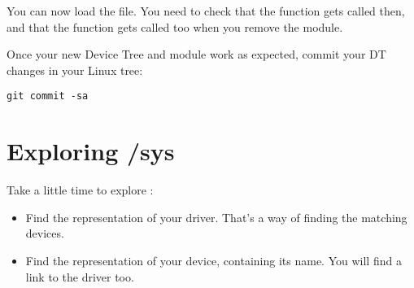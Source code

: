 You can now load the  file.
You need to check that the  function gets called
then, and that the  function gets called too
when you remove the module.

Once your new Device Tree and module work as expected, commit
your DT changes in your Linux tree:

\begin{verbatim}
git commit -sa
\end{verbatim}

\section{Exploring /sys}

Take a little time to explore :

\begin{itemize}
\item Find the representation of your driver. That's a way
      of finding the matching devices.
\item Find the representation of your device, containing its name.
      You will find a link to the driver too.
\end{itemize}
